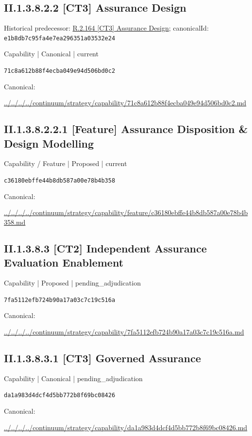 \documentclass[10pt,a4paper]{article}
\begin{document}
\subsection*{II.1.3.8.2.2 [CT3] Assurance Design}
Historical predecessor: \hyperref[element-e1b8db7c95fa4e7ea296351a03532e24]{R.2.164 [CT3] Assurance Design}; canonicalId: \texttt{e1b8db7c95fa4e7ea296351a03532e24}\par
\label{element-71c8a612b88f4ecba049e94d506bd0c2}
{\small Capability | Canonical | current}\par
\texttt{71c8a612b88f4ecba049e94d506bd0c2}\par
Canonical: \par
{\footnotesize\url{../../../../continuum/strategy/capability/71c8a612b88f4ecba049e94d506bd0c2.md}}\par
\subsection*{II.1.3.8.2.2.1 [Feature] Assurance Disposition \& Design Modelling}
\label{element-c36180ebffe44b8db587a00e78b4b358}
{\small Capability / Feature | Proposed | current}\par
\texttt{c36180ebffe44b8db587a00e78b4b358}\par
Canonical: \par
{\footnotesize\url{../../../../continuum/strategy/capability/feature/c36180ebffe44b8db587a00e78b4b358.md}}\par
\subsection*{II.1.3.8.3 [CT2] Independent Assurance Evaluation Enablement}
\label{element-7fa5112efb724b90a17a03c7c19c516a}
{\small Capability | Proposed | pending\_adjudication}\par
\texttt{7fa5112efb724b90a17a03c7c19c516a}\par
Canonical: \par
{\footnotesize\url{../../../../continuum/strategy/capability/7fa5112efb724b90a17a03c7c19c516a.md}}\par
\subsection*{II.1.3.8.3.1 [CT3] Governed Assurance}
\label{element-da1a983d4dcf4d5bb772b8f69bc08426}
{\small Capability | Canonical | pending\_adjudication}\par
\texttt{da1a983d4dcf4d5bb772b8f69bc08426}\par
Canonical: \par
{\footnotesize\url{../../../../continuum/strategy/capability/da1a983d4dcf4d5bb772b8f69bc08426.md}}\par
\end{document}
